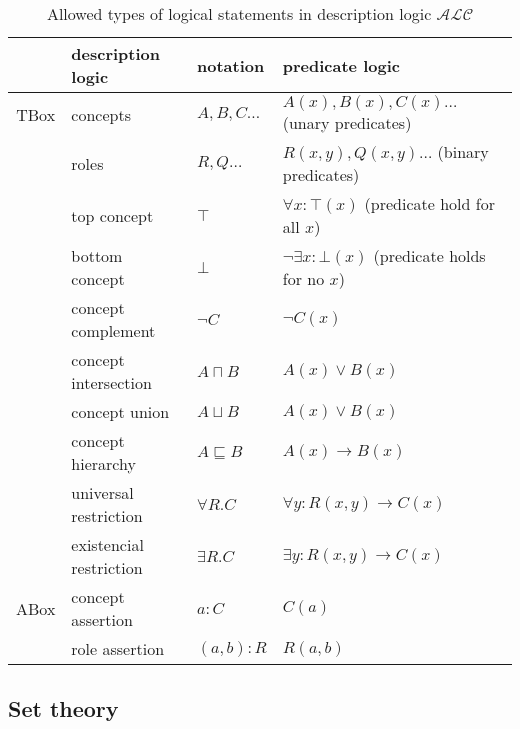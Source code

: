 \begin{table}
\centering
\begin{tabular}{|clll|}
\hline
& \textbf{description logic} & \textbf{notation} & \textbf{predicate logic} \\
\hline
TBox
& concepts                & $A, B, C\ldots$  & $A(x), B(x), C(x)\ldots$ (unary predicates) \\
& roles                   & $R, Q\ldots$     & $R(x,y), Q(x,y)\ldots$   (binary predicates) \\
& top concept             & $\top$           & $\forall x: \top(x)$ (predicate hold for all $x$) \\
& bottom concept          & $\bot$           & $\lnot \exists x: \bot(x)$ (predicate holds for no $x$) \\
& concept complement      & $\lnot C$        & $\lnot C(x)$ \\
& concept intersection    & $A\sqcap B$      & $A(x) \lor B(x)$  \\
& concept union           & $A\sqcup B$      & $A(x) \lor B(x)$ \\
& concept hierarchy       & $A\sqsubseteq B$ & $A(x) \to B(x)$ \\
& universal restriction   & $\forall R.C$ & $\forall y: R(x,y) \to C(x) $ \\
& existencial restriction & $\exists R.C$ & $\exists y: R(x,y) \to C(x) $ \\
\hline
ABox
& concept assertion       & $a:C$     & $C(a)$ \\
& role assertion          & $(a,b):R$ & $R(a,b)$ \\
\hline
\end{tabular}
\caption{Allowed types of logical statements in description logic $\mathcal{ALC}$}
\label{tab:dlogic}
\end{table}


\subsection{Set theory}
\label{sec:settheory}

